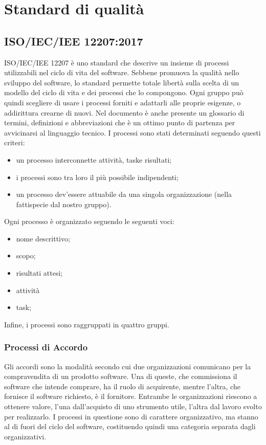 \section{Standard di qualità}
	\subsection{ISO/IEC/IEE 12207:2017}
	ISO/IEC/IEE 12207 è uno standard che descrive un insieme di processi utilizzabili nel ciclo di vita del software. 
	Sebbene promuova la qualità nello sviluppo del software, lo standard permette totale libertà sulla scelta di un modello del ciclo di vita e dei processi che lo compongono. Ogni gruppo può quindi scegliere di usare i processi forniti e adattarli alle proprie esigenze, o addirittura crearne di nuovi.\newline 
	Nel documento è anche presente un glossario di termini, definizioni e abbreviazioni che è un ottimo punto di partenza per avvicinarsi al linguaggio tecnico.\newline 
	I processi sono stati determinati seguendo questi criteri:
	\begin{itemize}
		\item un processo interconnette attività, task\glosp e risultati;
		\item i processi sono tra loro il più possibile indipendenti;
		\item un processo dev'essere attuabile da una singola organizzazione (nella fattispecie dal nostro gruppo).
	\end{itemize}
	Ogni processo è organizzato seguendo le seguenti voci:
	\begin{itemize}
		\item nome descrittivo;
		\item scopo;
		\item risultati attesi;
		\item attività
		\item task;
	\end{itemize}
	Infine, i processi sono raggruppati in quattro gruppi.
		\subsubsection{Processi di Accordo}
		Gli accordi sono la modalità secondo cui due organizzazioni comunicano per la compravendita di un prodotto software. Una di queste, che commissiona il software che intende comprare, ha il ruolo di acquirente, mentre l'altra, che fornisce il software richiesto, è il fornitore. Entrambe le organizzazioni riescono a ottenere valore, l'una dall'acquisto di uno strumento utile, l'altra dal lavoro svolto per realizzarlo.
		I processi in questione sono di carattere organizzativo, ma stanno al di fuori del ciclo del software, costituendo quindi una categoria separata dagli organizzativi.
